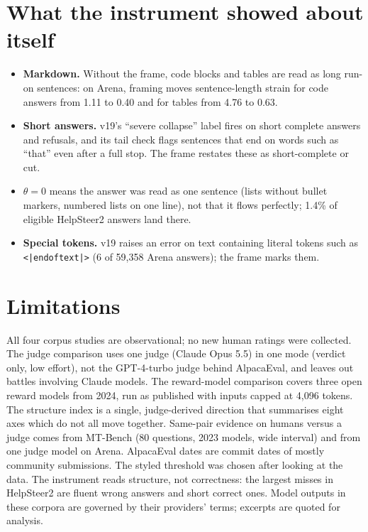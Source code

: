 \documentclass[11pt]{article}
\begin{document}
\section{What the instrument showed about itself}\label{sec:instrument-notes}
\begin{itemize}
\item \textbf{Markdown.} Without the frame, code blocks and tables are read as long run-on sentences: on Arena, framing moves sentence-length strain for code answers from 1.11 to 0.40 and for tables from 4.76 to 0.63.
\item \textbf{Short answers.} v19's ``severe collapse'' label fires on short complete answers and refusals, and its tail check flags sentences that end on words such as ``that'' even after a full stop. The frame restates these as short-complete or cut.
\item \textbf{$\theta=0$} means the answer was read as one sentence (lists without bullet markers, numbered lists on one line), not that it flows perfectly; 1.4\% of eligible HelpSteer2 answers land there.
\item \textbf{Special tokens.} v19 raises an error on text containing literal tokens such as \texttt{<|endoftext|>} (6 of 59,358 Arena answers); the frame marks them.
\end{itemize}

\section{Limitations}
All four corpus studies are observational; no new human ratings were collected. The judge comparison uses one judge (Claude Opus 5.5) in one mode (verdict only, low effort), not the GPT-4-turbo judge behind AlpacaEval, and leaves out battles involving Claude models. The reward-model comparison covers three open reward models from 2024, run as published with inputs capped at 4,096 tokens. The structure index is a single, judge-derived direction that summarises eight axes which do not all move together. Same-pair evidence on humans versus a judge comes from MT-Bench (80 questions, 2023 models, wide interval) and from one judge model on Arena. AlpacaEval dates are commit dates of mostly community submissions. The styled threshold was chosen after looking at the data. The instrument reads structure, not correctness: the largest misses in HelpSteer2 are fluent wrong answers and short correct ones. Model outputs in these corpora are governed by their providers' terms; excerpts are quoted for analysis.
\end{document}
